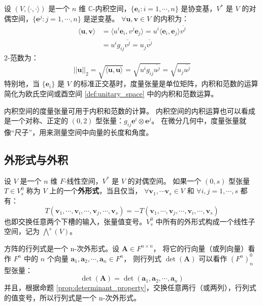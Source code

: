 \begin{example}[计算内积与范数]
    设 $(V,\langle \cdot,\cdot\rangle)$ 是一个 $n$ 维 $\mathbb{C}$-内积空间，$\{\mathbf{e}_i:i=1,\cdots,n\}$ 是协变基，$V^*$ 是 $V$ 的对偶空间，$\{\mathbf{e}^j:j=1,\cdots,n\}$ 是逆变基。
    $\forall \mathbf{u},\mathbf{v}\in V$ 的内积为：
    \begin{align*}
        \langle \mathbf{u},\mathbf{v} \rangle &= \langle u^i \mathbf{e}_i, v^j \mathbf{e}_j \rangle = u^i \langle \mathbf{e}_i, \mathbf{e}_j \rangle \overline{v^j} \\
        & = u^i  g_{ij} \overline{v^j} = u_j \overline{v^j} 
    \end{align*}
    2-范数为：
    \[
        ||\mathbf{u}||_2 = \sqrt{\langle \mathbf{u},\mathbf{u} \rangle} =  \sqrt{u^i  g_{ij} \overline{u^j}} = \sqrt{u_j \overline{u^j}} 
    \]
    特别地，当 $\{\mathbf{e}_i\}$ 是 $V$ 的标准正交基时，度量张量是单位矩阵，内积和范数的运算简化为欧氏空间或酉空间 \ref{def:unitary_space} 中的内积和范数运算。
\end{example}

\begin{note}
    内积空间的度量张量可用于内积和范数的计算。
    内积空间的内积运算也可以看成是一个对称、正定的 $(0,2)$ 型张量：$g_{ij} \mathbf{e}^i \otimes \mathbf{e}^j$。
    在微分几何中，度量张量就像“尺子”，用来测量空间中向量的长度和角度。
\end{note}

\vspace{1em}
\subsection{外形式与外积}

\begin{definition}
    设 $V$ 是一个 $n$ 维 $F$-线性空间，$V^*$ 是 $V$ 的对偶空间。
    如果一个 $(0,s)$ 型张量 $T \in V^0_s$ 称为 $V$ 上的一个\textbf{外形式}，当且仅当，
    $\forall \mathbf{v}_1,\cdots\mathbf{v}_s \in V$ 和 $\forall i,j = 1,\cdots,s$ 都有：
    \[
        T(\mathbf{v}_1,\cdots,\mathbf{v}_i,\cdots,\mathbf{v}_j,\cdots,\mathbf{v}_s) = -T(\mathbf{v}_1,\cdots,\mathbf{v}_j,\cdots,\mathbf{v}_i,\cdots,\mathbf{v}_s)
    \]
    也即交换任意两个下槽的输入，张量值变号。$V^0_s$ 中所有的外形式构成一个线性子空间，记为 $\bigwedge^s(V)$。
    \label{def:exterior_form}
\end{definition}

\begin{example}
    方阵的行列式是一个 n-次外形式。设 $\mathbf{A}\in F^{n\times n}$，
    将它的行向量（或列向量）看作 $F^n$ 中的 $n$ 个向量 $\mathbf{a}_1,\mathbf{a}_2,\cdots,\mathbf{a}_n\in F^n$，
    则行列式 $\det(\mathbf{A})$ 可以看作 $(F^n)^0_n$ 型张量：
    \[
        \det(\mathbf{A}) = \det(\mathbf{a}_1,\mathbf{a}_2,\cdots,\mathbf{a}_n)
    \]
    并且，根据命题 \ref{prop:determinant_property}，交换任意两行（或两列），行列式的值变号，所以行列式是一个 n-次外形式。
    \label{ex:determinant_exterior_form}
\end{example}

